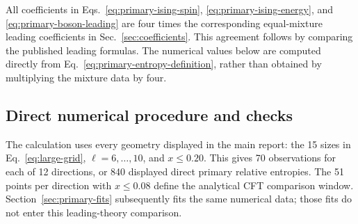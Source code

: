 All coefficients in Eqs.~\eqref{eq:primary-ising-spin},
\eqref{eq:primary-ising-energy}, and \eqref{eq:primary-boson-leading}
are four times the corresponding equal-mixture leading coefficients in
Sec.~\ref{sec:coefficients}. This agreement follows by comparing the
published leading formulas. The numerical values below are computed
directly from Eq.~\eqref{eq:primary-entropy-definition}, rather than
obtained by multiplying the mixture data by four.

\subsection{Direct numerical procedure and checks}
\label{sec:primary-numerics}
The calculation uses every geometry displayed in the main report:
the 15 sizes in Eq.~\eqref{eq:large-grid}, $\ell=6,\ldots,10$, and
$x\leq0.20$. This gives 70 observations for each of 12 directions,
or 840 displayed direct primary relative entropies. The 51 points per direction
with $x\leq0.08$ define the analytical CFT comparison window.
Section~\ref{sec:primary-fits} subsequently fits the same numerical
data; those fits do not enter this leading-theory comparison.
